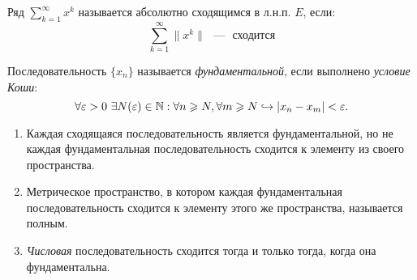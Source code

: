 \begin{definition}
	Ряд $\sum\limits_{k=1}^\infty x^k$ называется абсолютно сходящимся в л.н.п. $E$, если:\[
		\sum_{k=1}^{\infty} \|x^k\| \text{ ~---~ сходится}
	\]
\end{definition}
\begin{reminder}
    Последовательность $\{ x_{n} \}$ называется \textit{фундаментальной}, если выполнено \textit{условие Коши}:
$$ \forall \varepsilon > 0 \  \exists N (\varepsilon) \in \mathbb{N}: \forall n \geqslant N, \forall m \geqslant N \hookrightarrow |x_{n} - x_{m}| < \varepsilon. $$
\begin{enumerate}
    \item Каждая сходящаяся последовательность является фундаментальной, но не каждая фундаментальная последовательность сходится к элементу из своего пространства.
    \item Метрическое пространство, в котором каждая фундаментальная последовательность сходится к элементу этого же пространства, называется полным.
    \item \textit{Числовая} последовательность сходится тогда и только тогда, когда она фундаментальна.
\end{enumerate}

\end{reminder}

